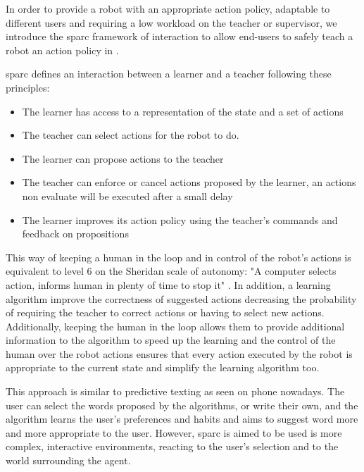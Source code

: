 In order to provide a robot with an appropriate action policy, adaptable to different users and requiring a low workload on the teacher or supervisor, we introduce the \acrfull{sparc} framework of interaction to allow end-users to safely teach a robot an action policy in \cite{senft2015sparc}.

\gls{sparc} defines an interaction between a learner and a teacher following these principles:
\begin{itemize}
	\item The learner has access to a representation of the state and a set of actions
	\item The teacher can select actions for the robot to do.
	\item The learner can propose actions to the teacher
	\item The teacher can enforce or cancel actions proposed by the learner, an actions non evaluate will be executed after a small delay
	\item The learner improves its action policy using the teacher's commands and feedback on propositions
\end{itemize} 
    
This way of keeping a human in the loop and in control of the robot's actions is equivalent to level 6 on the Sheridan scale of autonomy: "A computer selects action, informs human in plenty of time to stop it" \citep{sheridan1978human}. In addition, a learning algorithm improve the correctness of suggested actions decreasing the probability of requiring the teacher to correct actions or having to select new actions. Additionally, keeping the human in the loop allows them to provide additional information to the algorithm to speed up the learning and the control of the human over the robot actions ensures that every action executed by the robot is appropriate to the current state and simplify the learning algorithm too.

This approach is similar to predictive texting as seen on phone nowadays. The user can select the words proposed by the algorithms, or write their own, and the algorithm learns the user's preferences and habits and aims to suggest word more and more appropriate to the user. However, \gls{sparc} is aimed to be used is more complex, interactive environments, reacting to the user's selection and to the world surrounding the agent.

